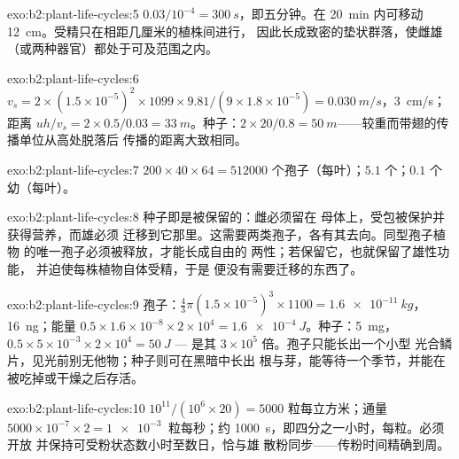 \begin{solution}{exo:b2:plant-life-cycles:5}
$0.03/10^{-4} = \qty{300}{s}$，即五分钟。在 \qty{20}{min}
内可移动 \qty{12}{cm}。受精只在相距几厘米的植株间进行，
因此长成致密的垫状群落，使雌雄
（或两种器官）都处于可及范围之内。
\end{solution}

\begin{solution}{exo:b2:plant-life-cycles:6}
$v_s = 2\times(1.5\times 10^{-5})^2\times 1099\times 9.81/(9\times
1.8\times 10^{-5}) = \qty{0.030}{m/s}$，\qty{3}{cm/s}；距离 $uh/v_s
= 2\times 0.5/0.03 = \qty{33}{m}$。种子：$2\times 20/0.8 =
\qty{50}{m}$——较重而带翅的传播单位从高处脱落后
传播的距离大致相同。
\end{solution}

\begin{solution}{exo:b2:plant-life-cycles:7}
$200\times 40\times 64 = \num{512000}$ 个孢子（每叶）；$5.1$
个；$0.1$ 个幼（每叶）。
\end{solution}

\begin{solution}{exo:b2:plant-life-cycles:8}
种子即是被保留的：雌必须留在
母体上，受包被保护并获得营养，而雄必须
迁移到它那里。这需要两类孢子，各有其去向。同型孢子植物
的唯一孢子必须被释放，才能长成自由的
两性；若保留它，也就保留了雄性功能，
并迫使每株植物自体受精，于是
便没有需要迁移的东西了。
\end{solution}

\begin{solution}{exo:b2:plant-life-cycles:9}
孢子：$\tfrac43\pi(1.5\times 10^{-5})^3\times 1100 =
\qty{1.6e-11}{kg}$，\qty{16}{ng}；能量 $0.5\times 1.6\times
10^{-8}\times 2\times 10^{4} = \qty{1.6e-4}{J}$。种子：\qty{5}{mg}，
$0.5\times 5\times 10^{-3}\times 2\times 10^{4} = \qty{50}{J}$ ---
是其 $3\times 10^{5}$ 倍。孢子只能长出一个小型
光合鳞片，见光前别无他物；种子则可在黑暗中长出
根与芽，能等待一个季节，并能在
被吃掉或干燥之后存活。
\end{solution}

\begin{solution}{exo:b2:plant-life-cycles:10}
$10^{11}/(10^{6}\times 20) = \num{5000}$ 粒每立方米；通量
$5000\times 10^{-7}\times 2 = \qty{1e-3}{}$ 粒每秒；约
\qty{1000}{s}，即四分之一小时，每粒。必须开放
并保持可受粉状态数小时至数日，恰与雄
散粉同步——传粉时间精确到周。
\end{solution}

